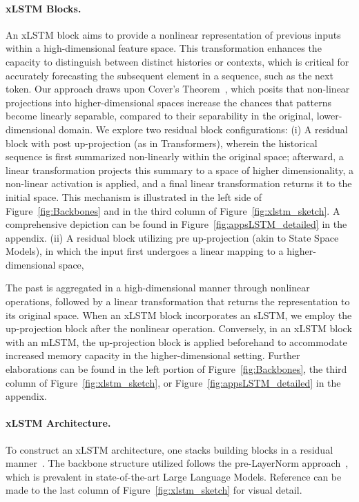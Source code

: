 \paragraph{xLSTM Blocks.}
\label{sec:xLSTMblock}
An xLSTM block aims to provide a nonlinear representation of previous inputs within a high-dimensional feature space. This transformation enhances the capacity to distinguish between distinct histories or contexts, which is critical for accurately forecasting the subsequent element in a sequence, such as the next token. Our approach draws upon Cover’s Theorem~\citep{Cover:65}, which posits that non-linear projections into higher-dimensional spaces increase the chances that patterns become linearly separable, compared to their separability in the original, lower-dimensional domain. We explore two residual block configurations: (i) A residual block with post up-projection (as in Transformers), wherein the historical sequence is first summarized non-linearly within the original space; afterward, a linear transformation projects this summary to a space of higher dimensionality, a non-linear activation is applied, and a final linear transformation returns it to the initial space. This mechanism is illustrated in the left side of Figure~\ref{fig:Backbones} and in the third column of Figure~\ref{fig:xlstm_sketch}. A comprehensive depiction can be found in Figure~\ref{fig:appsLSTM_detailed} in the appendix. (ii) A residual block utilizing pre up-projection (akin to State Space Models), in which the input first undergoes a linear mapping to a higher-dimensional space,

The past is aggregated in a high-dimensional manner through nonlinear operations, followed by a linear transformation that returns the representation to its original space. When an xLSTM block incorporates an sLSTM, we employ the up-projection block after the nonlinear operation. Conversely, in an xLSTM block with an mLSTM, the up-projection block is applied beforehand to accommodate increased memory capacity in the higher-dimensional setting. Further elaborations can be found in the left portion of Figure~\ref{fig:Backbones}, the third column of Figure~\ref{fig:xlstm_sketch}, or Figure~\ref{fig:appsLSTM_detailed} in the appendix.

\paragraph{xLSTM Architecture. }
\label{sec:xLSTMarchitecure}
To construct an xLSTM architecture, one stacks building blocks in a residual manner~\citep{Srivastava:15,He:16}. The backbone structure utilized follows the pre-LayerNorm approach~\citep{Ba:16b}, which is prevalent in state-of-the-art Large Language Models. Reference can be made to the last column of Figure~\ref{fig:xlstm_sketch} for visual detail.

